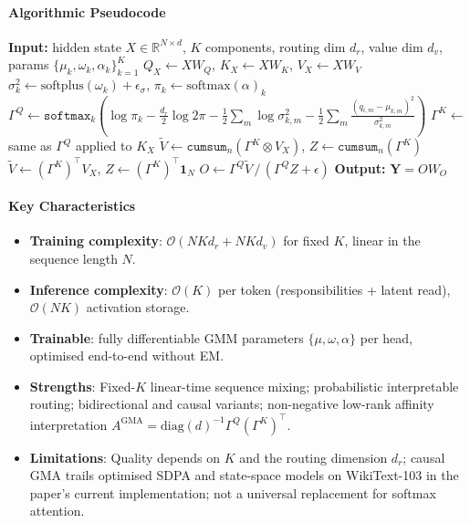 \paragraph{Algorithmic Pseudocode}
\begin{algorithmic}[1]
\State \textbf{Input:} hidden state $X \in \mathbb{R}^{N \times d}$, $K$ components, routing dim $d_r$, value dim $d_v$, params $\{\mu_k, \omega_k, \alpha_k\}_{k=1}^{K}$
\State $Q_X \gets X W_Q$, \quad $K_X \gets X W_K$, \quad $V_X \gets X W_V$ 
\State $\sigma^2_k \gets \text{softplus}(\omega_k) + \epsilon_\sigma$, \quad $\pi_k \gets \text{softmax}(\alpha)_k$ 
\State $\Gamma^Q \gets \texttt{softmax}_k\!\left(\log \pi_k - \tfrac{d_r}{2}\log 2\pi - \tfrac{1}{2}\sum_m \log \sigma^2_{k,m} - \tfrac{1}{2}\sum_m \frac{(q_{i,m}-\mu_{k,m})^2}{\sigma^2_{k,m}}\right)$
\State $\Gamma^K \gets$ same as $\Gamma^Q$ applied to $K_X$
    \State $\tilde V \gets \texttt{cumsum}_n(\Gamma^K \otimes V_X)$, \quad $Z \gets \texttt{cumsum}_n(\Gamma^K)$ 
\Else
    \State $\tilde V \gets (\Gamma^K)^\top V_X$, \quad $Z \gets (\Gamma^K)^\top \mathbf{1}_N$ 
\EndIf
\State $O \gets \Gamma^Q \tilde V \,/\, (\Gamma^Q Z + \epsilon)$ 
\State \textbf{Output:} $\mathbf{Y} = O W_O$
\end{algorithmic}

\paragraph{Key Characteristics}
\begin{itemize}[leftmargin=*]
    \item \textbf{Training complexity}: $\mathcal{O}(N K d_r + N K d_v)$ for fixed $K$, linear in the sequence length $N$.
    \item \textbf{Inference complexity}: $\mathcal{O}(K)$ per token (responsibilities + latent read), $\mathcal{O}(NK)$ activation storage.
    \item \textbf{Trainable}: fully differentiable GMM parameters $\{\mu, \omega, \alpha\}$ per head, optimised end-to-end without EM.
    \item \textbf{Strengths}: Fixed-$K$ linear-time sequence mixing; probabilistic interpretable routing; bidirectional and causal variants; non-negative low-rank affinity interpretation $A^{\text{GMA}} = \mathrm{diag}(d)^{-1} \Gamma^Q (\Gamma^K)^\top$.
    \item \textbf{Limitations}: Quality depends on $K$ and the routing dimension $d_r$; causal GMA trails optimised SDPA and state-space models on WikiText-103 in the paper's current implementation; not a universal replacement for softmax attention.
\end{itemize}
